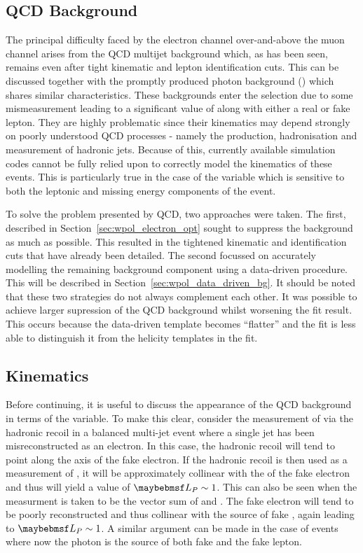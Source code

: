 \subsection{\ac{QCD} Background}
The principal difficulty faced by the electron channel over-and-above the muon
channel arises from the \ac{QCD} multijet background which, as has been seen,
remains even after tight kinematic and lepton identification cuts. This can be
discussed together with the promptly produced photon background (\gammajets)
which shares similar characteristics. These backgrounds enter the selection due
to some mismeasurement leading to a significant value of \PtW along with either
a real or fake lepton. They are highly problematic since their kinematics may
depend strongly on poorly understood \ac{QCD} processes - namely the production,
hadronisation and measurement of hadronic jets. Because of this, currently
available simulation codes cannot be fully relied upon to correctly model the
kinematics of these events. This is particularly true in the case of the \LP
variable which is sensitive to both the leptonic and missing energy components
of the event.

To solve the problem presented by \ac{QCD}, two approaches were taken. The
first, described in Section~\ref{sec:wpol_electron_opt} sought to suppress the
background as much as possible. This resulted in the tightened kinematic and
identification cuts that have already been detailed. The second focussed on
accurately modelling the remaining background component using a data-driven
procedure. This will be described in Section~\ref{sec:wpol_data_driven_bg}. It
should be noted that these two strategies do not always complement each
other. It was possible to achieve larger supression of the \ac{QCD} background
whilst worsening the fit result. This occurs because the data-driven template
becomes ``flatter'' and the fit is less able to distinguish it from the helicity
templates in the fit.

\subsection{Kinematics}
Before continuing, it is useful to discuss the appearance of the \ac{QCD}
background in terms of the \LP variable. To make this clear, consider the
measurement of \PtW via the hadronic recoil in a balanced multi-jet event where
a single jet has been misreconstructed as an electron. In this case, the
hadronic recoil will tend to point along the axis of the fake electron. If the
hadronic recoil is then used as a measurement of \PtW, it will be approximately
collinear with the \Pt of the fake electron and thus will yield a value of $\LP
\sim 1$. This can also be seen when the \PtW measurment is taken to be the
vector sum of \Ptl and \MET. The fake electron will tend to be poorly
reconstructed and thus collinear with the source of fake \MET, again leading to
$\LP \sim 1$. A similar argument can be made in the case of \gammajets events
where now the photon is the source of both fake \MET and the fake lepton.



